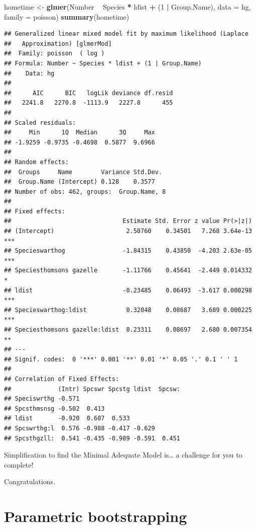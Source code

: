 \documentclass[]{book}
\newenvironment{Shaded}{\begin{snugshade}}{\end{snugshade}}
\newcommand{\KeywordTok}[1]{\textcolor[rgb]{0.13,0.29,0.53}{\textbf{#1}}}
\newcommand{\DataTypeTok}[1]{\textcolor[rgb]{0.13,0.29,0.53}{#1}}
\newcommand{\DecValTok}[1]{\textcolor[rgb]{0.00,0.00,0.81}{#1}}
\newcommand{\StringTok}[1]{\textcolor[rgb]{0.31,0.60,0.02}{#1}}
\newcommand{\OperatorTok}[1]{\textcolor[rgb]{0.81,0.36,0.00}{\textbf{#1}}}
\newcommand{\NormalTok}[1]{#1}
\theoremstyle{definition}
\theoremstyle{definition}
\theoremstyle{definition}
\theoremstyle{remark}
\begin{document}
\begin{Shaded}
\begin{Highlighting}[]
\NormalTok{hometime <-}\StringTok{ }\KeywordTok{glmer}\NormalTok{(Number }\OperatorTok{~}\StringTok{ }\NormalTok{Species }\OperatorTok{*}\StringTok{ }\NormalTok{ldist }\OperatorTok{+}\StringTok{ }\NormalTok{(}\DecValTok{1} \OperatorTok{|}\StringTok{ }\NormalTok{Group.Name), }
    \DataTypeTok{data =}\NormalTok{ hg, }\DataTypeTok{family =}\NormalTok{ poisson)}
\KeywordTok{summary}\NormalTok{(hometime)}
\end{Highlighting}
\end{Shaded}

\newpage

\begin{verbatim}
## Generalized linear mixed model fit by maximum likelihood (Laplace
##   Approximation) [glmerMod]
##  Family: poisson  ( log )
## Formula: Number ~ Species * ldist + (1 | Group.Name)
##    Data: hg
## 
##      AIC      BIC   logLik deviance df.resid 
##   2241.8   2270.8  -1113.9   2227.8      455 
## 
## Scaled residuals: 
##     Min      1Q  Median      3Q     Max 
## -1.9259 -0.9735 -0.4698  0.5877  9.6966 
## 
## Random effects:
##  Groups     Name        Variance Std.Dev.
##  Group.Name (Intercept) 0.128    0.3577  
## Number of obs: 462, groups:  Group.Name, 8
## 
## Fixed effects:
##                               Estimate Std. Error z value Pr(>|z|)    
## (Intercept)                    2.50760    0.34501   7.268 3.64e-13 ***
## Specieswarthog                -1.84315    0.43850  -4.203 2.63e-05 ***
## Speciesthomsons gazelle       -1.11766    0.45641  -2.449 0.014332 *  
## ldist                         -0.23485    0.06493  -3.617 0.000298 ***
## Specieswarthog:ldist           0.32048    0.08687   3.689 0.000225 ***
## Speciesthomsons gazelle:ldist  0.23311    0.08697   2.680 0.007354 ** 
## ---
## Signif. codes:  0 '***' 0.001 '**' 0.01 '*' 0.05 '.' 0.1 ' ' 1
## 
## Correlation of Fixed Effects:
##             (Intr) Spcswr Spcstg ldist  Spcsw:
## Speciswrthg -0.571                            
## Spcsthmsnsg -0.502  0.413                     
## ldist       -0.920  0.607  0.533              
## Spcswrthg:l  0.576 -0.988 -0.417 -0.629       
## Spcsthgzll:  0.541 -0.435 -0.989 -0.591  0.451
\end{verbatim}

Simplification to find the Minimal Adequate Model is\ldots{} a challenge
for you to complete!

Congratulations.

\hypertarget{parboot}{\section{Parametric bootstrapping}\label{parboot}}
\end{document}
